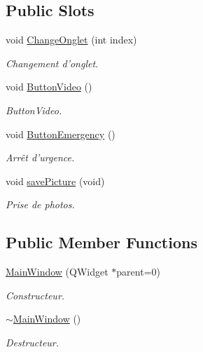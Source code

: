 \subsection*{Public Slots}
\begin{DoxyCompactItemize}
\item 
void \hyperlink{classMainWindow_a613b559650b3fe5dbe121de8abe92917}{Change\-Onglet} (int index)
\begin{DoxyCompactList}\small\item\em Changement d'onglet. \end{DoxyCompactList}\item 
void \hyperlink{classMainWindow_ad4e4c739790c121e308e876b490f6da9}{Button\-Video} ()
\begin{DoxyCompactList}\small\item\em Button\-Video. \end{DoxyCompactList}\item 
void \hyperlink{classMainWindow_a5d732a8b1e964a00dd04ed8ec2f5c1ef}{Button\-Emergency} ()
\begin{DoxyCompactList}\small\item\em Arrêt d'urgence. \end{DoxyCompactList}\item 
void \hyperlink{classMainWindow_a4d4b2c73d974fd4dbce801bdaf9b71f2}{save\-Picture} (void)
\begin{DoxyCompactList}\small\item\em Prise de photos. \end{DoxyCompactList}\end{DoxyCompactItemize}
\subsection*{Public Member Functions}
\begin{DoxyCompactItemize}
\item 
\hyperlink{classMainWindow_a8b244be8b7b7db1b08de2a2acb9409db}{Main\-Window} (Q\-Widget $\ast$parent=0)
\begin{DoxyCompactList}\small\item\em Constructeur. \end{DoxyCompactList}\item 
\hyperlink{classMainWindow_ae98d00a93bc118200eeef9f9bba1dba7}{$\sim$\-Main\-Window} ()
\begin{DoxyCompactList}\small\item\em Destructeur. \end{DoxyCompactList}\end{DoxyCompactItemize}
